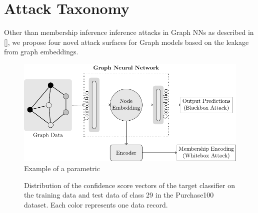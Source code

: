 \section{Attack Taxonomy}\label{attack}


Other than membership inference inference attacks in Graph NNs as described in [], we propose four novel attack surfaces for Graph models based on the leakage from graph embeddings.

\begin{figure}[!htb]
\centering
\includegraphics[width=0.85\linewidth]{./figures/Attacks/MIA.pdf}
\caption{Example of a parametric}
\end{figure}



\begin{figure}
    \centering
    \begin{minipage}[b]{1\linewidth}
    \centering


    \end{minipage}
    \caption{Distribution of the confidence score vectors of the target classifier on the training data and test data of class 29 in the Purchase100 dataset. Each color represents one data record.}
    \label{fig:soft_label}
\end{figure}



